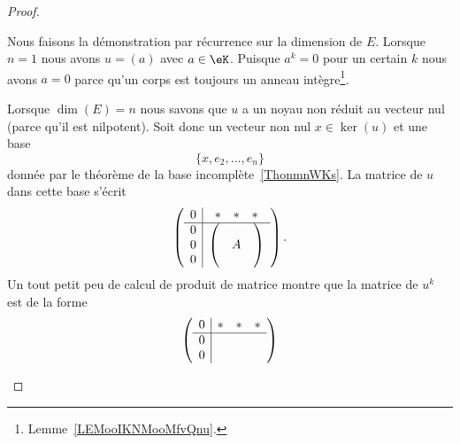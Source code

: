 \begin{proof}
	\begin{subproof}
		\spitem[\( \Rightarrow\)]
		Nous faisons la démonstration par récurrence sur la dimension de \( E\). Lorsque \( n=1\) nous avons \( u=(a)\) avec \( a\in \eK\). Puisque \( a^k=0\) pour un certain \( k\) nous avons \( a=0\) parce qu'un corps est toujours un anneau intègre\footnote{Lemme~\ref{LEMooIKNMooMfvQnu}.}.

		Lorsque \( \dim(E)=n\) nous savons que \( u\) a un noyau non réduit au vecteur nul (parce qu'il est nilpotent). Soit donc un vecteur non nul \( x\in\ker(u)\) et une base
		\begin{equation}
			\{ x,e_2,\ldots, e_n \}
		\end{equation}
		donnée par le théorème de la base incomplète~\ref{ThonmnWKs}. La matrice de \( u\) dans cette base s'écrit
		\begin{equation}
			\begin{pmatrix}
				\begin{array}[]{c|c}
					0              & \begin{matrix}
						                 * & * & *
					                 \end{matrix} \\
					\hline
					\begin{matrix}
						0 \\
						0 \\
						0
					\end{matrix} &
					\begin{pmatrix}
						 &   & \\
						 & A & \\
						 &   &
					\end{pmatrix}
				\end{array}
			\end{pmatrix}.
		\end{equation}
		Un tout petit peu de calcul de produit de matrice montre que la matrice de \( u^k\) est de la forme
		\begin{equation}
			\begin{pmatrix}
				\begin{array}[]{c|c}
					0              & \begin{matrix}
						                 * & * & *
					                 \end{matrix} \\
					\hline
					\begin{matrix}
						0 \\
						0 \\

\end{matrix}
\end{array}
\end{pmatrix}
\end{equation}
\end{subproof}
\end{proof}
